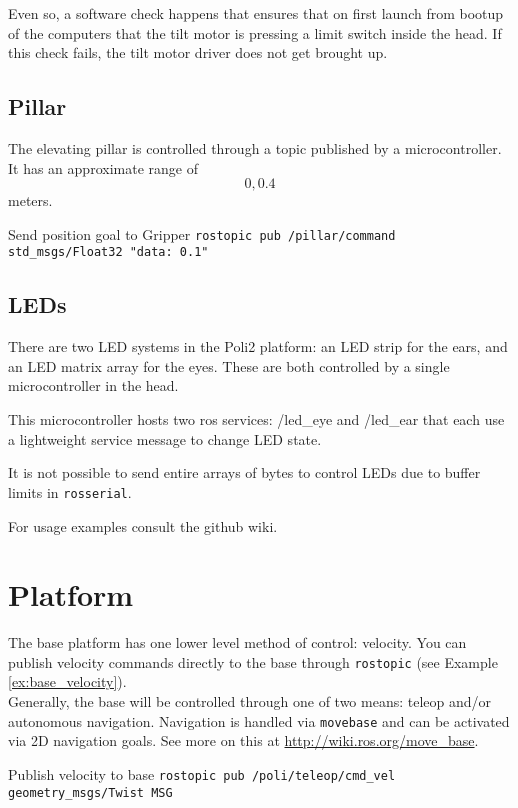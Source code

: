 Even so, a software check happens that ensures that on first launch from bootup of the computers that the tilt motor is pressing a limit switch inside the head. 
If this check fails, the tilt motor driver does not get brought up.

\subsection{Pillar}
The elevating pillar is controlled through a topic published by a microcontroller. It has an approximate range of \[0,0.4\] meters.

\begin{example}{Send position goal to Gripper}
  \label{ex:pillar_pos_goal}
    \texttt{rostopic pub /pillar/command std\_msgs/Float32 "data: 0.1"} \\
\end{example}

\subsection{LEDs}
There are two LED systems in the Poli2 platform: an LED strip for the ears, and an LED matrix array for the eyes. 
These are both controlled by a single microcontroller in the head. 

This microcontroller hosts two ros services: /led\_eye and /led\_ear that each use a lightweight service message to change LED state. 

It is not possible to send entire arrays of bytes to control LEDs due to buffer limits in \texttt{rosserial}. 

For usage examples consult the github wiki.

\section{Platform}
The base platform has one lower level method of control: velocity. 
You can publish velocity commands directly to the base through \texttt{rostopic} (see Example \ref{ex:base_velocity}). \\

Generally, the base will be controlled through one of two means: teleop and/or autonomous navigation. 
Navigation is handled via \texttt{movebase} and can be activated via 2D navigation goals. 
See more on this at \href{http://wiki.ros.org/move_base}{http://wiki.ros.org/move\_base}.

\begin{example}{Publish velocity to base}
  \label{ex:base_velocity}
    \texttt{rostopic pub /poli/teleop/cmd\_vel geometry\_msgs/Twist MSG}\\
\end{example}

